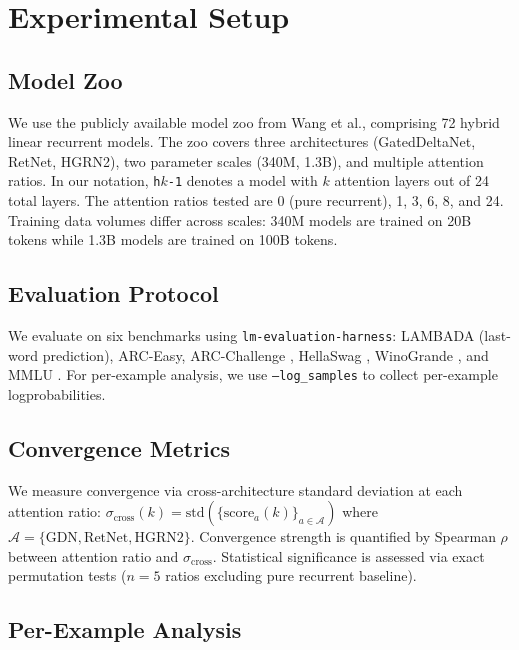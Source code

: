\documentclass[11pt,a4paper]{article}
\begin{document}
\section{Experimental Setup}

\subsection{Model Zoo}

We use the publicly available model zoo from Wang et al., comprising 72 hybrid linear recurrent models. The zoo covers three architectures (GatedDeltaNet, RetNet, HGRN2), two parameter scales (340M, 1.3B), and multiple attention ratios. In our notation, \texttt{h$k$-1} denotes a model with $k$ attention layers out of 24 total layers. The attention ratios tested are 0 (pure recurrent), 1, 3, 6, 8, and 24. Training data volumes differ across scales: 340M models are trained on 20B tokens while 1.3B models are trained on 100B tokens.

\subsection{Evaluation Protocol}

We evaluate on six benchmarks using \texttt{lm-evaluation-harness}: LAMBADA (last-word prediction), ARC-Easy, ARC-Challenge \citep{clark2018arc}, HellaSwag \citep{zellers2019hellaswag}, WinoGrande \citep{sakaguchi2021winogrande}, and MMLU \citep{hendrycks2021mmlu}. For per-example analysis, we use \texttt{--log\_samples} to collect per-example logprobabilities.

\subsection{Convergence Metrics}

We measure convergence via cross-architecture standard deviation at each attention ratio: $\sigma_{\text{cross}}(k) = \text{std}(\{\text{score}_a(k)\}_{a \in \mathcal{A}})$ where $\mathcal{A} = \{\text{GDN}, \text{RetNet}, \text{HGRN2}\}$. Convergence strength is quantified by Spearman $\rho$ between attention ratio and $\sigma_{\text{cross}}$. Statistical significance is assessed via exact permutation tests ($n{=}5$ ratios excluding pure recurrent baseline).

\subsection{Per-Example Analysis}
\end{document}
